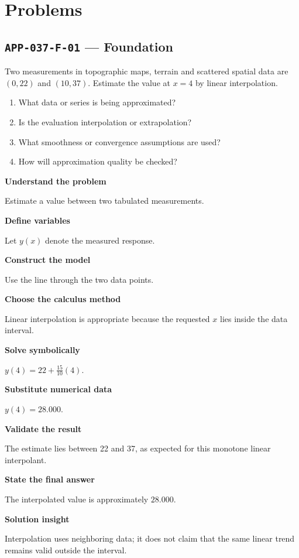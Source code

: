 \documentclass[11pt]{book}
\newcommand{\pid}[1]{\texttt{#1}}
\begin{document}
\section*{Problems}
\subsection*{\pid{APP-037-F-01} — Foundation}
\begin{problembox}
Two measurements in topographic maps, terrain and scattered spatial data are $(0,22)$ and $(10,37)$. Estimate the value at $x=4$ by linear interpolation.
\end{problembox}
\begin{promptbox}\begin{enumerate}
\item What data or series is being approximated?
\item Is the evaluation interpolation or extrapolation?
\item What smoothness or convergence assumptions are used?
\item How will approximation quality be checked?
\end{enumerate}\end{promptbox}
\begin{solutionbox}
\textbf{Understand the problem}\par Estimate a value between two tabulated measurements.\par\medskip
\textbf{Define variables}\par Let $y(x)$ denote the measured response.\par\medskip
\textbf{Construct the model}\par Use the line through the two data points.\par\medskip
\textbf{Choose the calculus method}\par Linear interpolation is appropriate because the requested $x$ lies inside the data interval.\par\medskip
\textbf{Solve symbolically}\par $y(4)=22+\frac{15}{10}(4)$.\par\medskip
\textbf{Substitute numerical data}\par $y(4)=28.000$.\par\medskip
\textbf{Validate the result}\par The estimate lies between 22 and 37, as expected for this monotone linear interpolant.\par\medskip
\textbf{State the final answer}\par The interpolated value is approximately $28.000$.\par\medskip
\textbf{Solution insight}\par Interpolation uses neighboring data; it does not claim that the same linear trend remains valid outside the interval.\par\medskip
\end{solutionbox}
\end{document}
